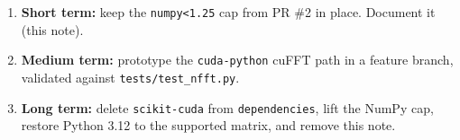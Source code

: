 \documentclass[11pt,a4paper]{article}
\begin{document}
\begin{enumerate}[leftmargin=1.6em]
    \item \textbf{Short term:} keep the \texttt{numpy<1.25} cap from PR \#2 in
    place. Document it (this note).
    \item \textbf{Medium term:} prototype the \texttt{cuda-python} cuFFT path
    in a feature branch, validated against \texttt{tests/test\_nfft.py}.
    \item \textbf{Long term:} delete \texttt{scikit-cuda} from
    \texttt{dependencies}, lift the NumPy cap, restore Python 3.12 to the
    supported matrix, and remove this note.
\end{enumerate}
\end{document}
